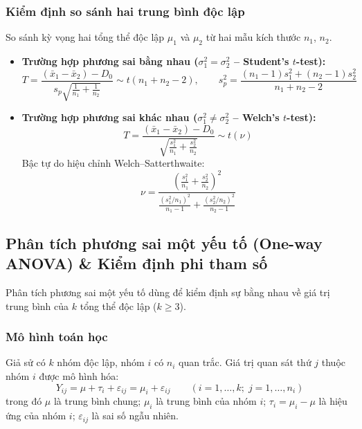 \documentclass[12pt,a4paper]{article}
\newcommand{\xbar}{\bar{x}}
\begin{document}
\subsubsection{Kiểm định so sánh hai trung bình độc lập}

So sánh kỳ vọng hai tổng thể độc lập $\mu_1$ và $\mu_2$ từ hai mẫu kích thước $n_1$, $n_2$.
\begin{itemize}
  \item \textbf{Trường hợp phương sai bằng nhau ($\sigma_1^2 = \sigma_2^2$ -- Student's $t$-test):}
  \begin{equation}
    T = \frac{(\xbar_1 - \xbar_2) - D_0}{s_p\sqrt{\frac{1}{n_1}+\frac{1}{n_2}}} \sim t(n_1+n_2-2),
    \qquad s_p^2 = \frac{(n_1-1)s_1^2 + (n_2-1)s_2^2}{n_1+n_2-2}
  \end{equation}
  \item \textbf{Trường hợp phương sai khác nhau ($\sigma_1^2 \ne \sigma_2^2$ -- Welch's $t$-test):}
  \begin{equation}
    T = \frac{(\xbar_1 - \xbar_2) - D_0}{\sqrt{\frac{s_1^2}{n_1}+\frac{s_2^2}{n_2}}} \sim t(\nu)
  \end{equation}
  Bậc tự do hiệu chỉnh Welch--Satterthwaite:
  \begin{equation}
    \nu = \frac{\left(\frac{s_1^2}{n_1}+\frac{s_2^2}{n_2}\right)^2}
               {\frac{(s_1^2/n_1)^2}{n_1-1} + \frac{(s_2^2/n_2)^2}{n_2-1}}
  \end{equation}
\end{itemize}

\subsection{Phân tích phương sai một yếu tố (One-way ANOVA) \& Kiểm định phi tham số}

Phân tích phương sai một yếu tố dùng để kiểm định sự bằng nhau về giá trị trung bình của $k$
tổng thể độc lập ($k \ge 3$).

\subsubsection{Mô hình toán học}

Giả sử có $k$ nhóm độc lập, nhóm $i$ có $n_i$ quan trắc. Giá trị quan sát thứ $j$ thuộc nhóm
$i$ được mô hình hóa:
\begin{equation}
  Y_{ij} = \mu + \tau_i + \varepsilon_{ij} = \mu_i + \varepsilon_{ij}
  \qquad (i = 1,\dots,k;\; j = 1,\dots,n_i)
\end{equation}
trong đó $\mu$ là trung bình chung; $\mu_i$ là trung bình của nhóm $i$; $\tau_i = \mu_i - \mu$
là hiệu ứng của nhóm $i$; $\varepsilon_{ij}$ là sai số ngẫu nhiên.
\end{document}
